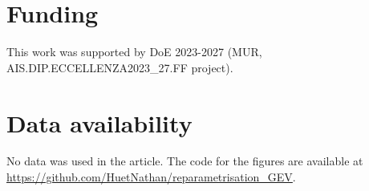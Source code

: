 \documentclass{article}
\newcommand{\1}{\mathds{1}}
\theoremstyle{definition}
\begin{document}
\section*{Funding}

This work was supported by DoE 2023-2027 (MUR, AIS.DIP.ECCELLENZA2023\_27.FF project). 


\section*{Data availability}
No data was used in the article. The code for the figures are available at \url{https://github.com/HuetNathan/reparametrisation_GEV}.






\end{document}

